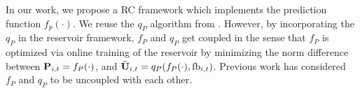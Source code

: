 \documentclass[conference]{IEEEtran}
\begin{document}
{%

In our work, we propose a RC framework which implements the prediction function $f_p(\cdot)$.
We reuse the $q_P$ algorithm from \cite{Gupt1905:Predictive,6891198}.
However, by incorporating the $q_P$ in the reservoir framework, $f_P$ and $q_P$ get coupled in the sense that $f_P$ is optimized via online training of the reservoir by minimizing the norm difference between ${\bf P}_{i,t}=f_P(\cdot)$, and $\tilde{{\bf U}}_{i,t}=q_P(f_P(\cdot),\text{fb}_{i,t})$.
Previous work \cite{Gupt1905:Predictive,6891198} has considered $f_P$ and $q_P$ to be uncoupled with each other.

}
\end{document}
